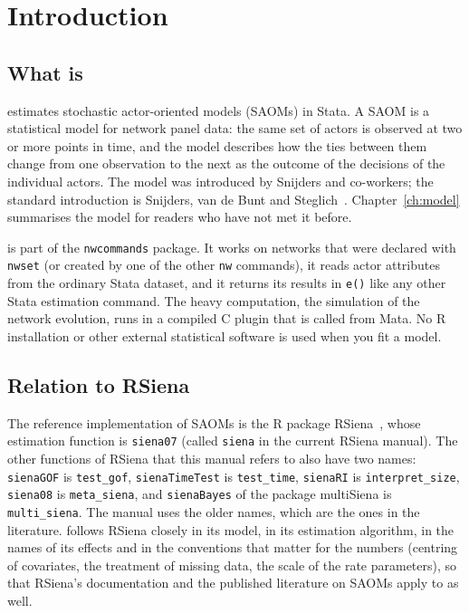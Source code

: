 \chapter{Introduction}\label{ch:intro}

\section{What \texorpdfstring{\nwsaom}{nwsaom} is}

\nwsaom{} estimates stochastic actor-oriented models (SAOMs) in Stata. A SAOM is a statistical model for network panel data: the same set of actors is observed at two or more points in time, and the model describes how the ties between them change from one observation to the next as the outcome of the decisions of the individual actors. The model was introduced by Snijders and co-workers; the standard introduction is Snijders, van de Bunt and Steglich~\cite{snijders2010}. Chapter~\ref{ch:model} summarises the model for readers who have not met it before.

\nwsaom{} is part of the \texttt{nwcommands} package. It works on networks that were declared with \texttt{nwset} (or created by one of the other \texttt{nw} commands), it reads actor attributes from the ordinary Stata dataset, and it returns its results in \texttt{e()} like any other Stata estimation command. The heavy computation, the simulation of the network evolution, runs in a compiled C plugin that is called from Mata. No R installation or other external statistical software is used when you fit a model.

\section{Relation to RSiena}

The reference implementation of SAOMs is the R package RSiena~\cite{ripley}, whose estimation function is \texttt{siena07} (called \texttt{siena} in the current RSiena manual). The other functions of RSiena that this manual refers to also have two names: \texttt{sienaGOF} is \texttt{test\_gof}, \texttt{sienaTimeTest} is \texttt{test\_time}, \texttt{sienaRI} is \texttt{interpret\_size}, \texttt{siena08} is \texttt{meta\_siena}, and \texttt{sienaBayes} of the package multiSiena is \texttt{multi\_siena}. The manual uses the older names, which are the ones in the literature. \nwsaom{} follows RSiena closely in its model, in its estimation algorithm, in the names of its effects and in the conventions that matter for the numbers (centring of covariates, the treatment of missing data, the scale of the rate parameters), so that RSiena's documentation and the published literature on SAOMs apply to \nwsaom{} as well.

